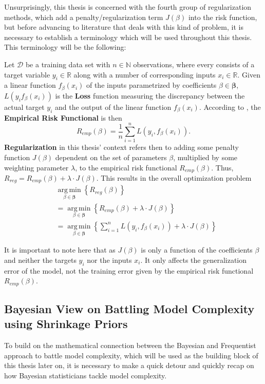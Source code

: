 \documentclass[12pt,a4paper]{article}
\DeclareMathOperator*{\argmin}{arg\,min}
\begin{document}
Unsurprisingly, this thesis is concerned with the fourth group of regularization methods, which add a penalty/regularization term $J(\beta)$ into the risk function, but before advancing to literature that deals with this kind of problem, it is necessary to establish a terminology which will be used throughout this thesis. This terminology will be the following:

Let $\mathcal{D}$ be a training data set with $n \in \mathbb{N}$ observations, where every  consists of a target variable $y_i \in \mathbb{R}$ along with a number of corresponding inputs $x_i \in \mathbb{R}$. Given a linear function $f_\beta(x_i)$ of the inputs parametrized by coefficients $\beta \in \boldsymbol{\beta}$, $L(y_i f_\beta(x_i))$ is the \textbf{Loss} function measuring the discrepancy between the actual target $y_i$ and the output of the linear function $f_\beta(x_i)$. According to \textcite{Vapnik1991}, the \textbf{Empirical Risk Functional} is then 
\[
R_{emp}(\beta) = \frac{1}{n} \sum_{i=1}^n L(y_i, f_\beta(x_i)).
\]
\textbf{Regularization} in this thesis' context refers then to adding some penalty function $J(\beta)$ dependent on the set of parameters $\beta$, multiplied by some weighting parameter $\lambda$, to the empirical risk functional $R_{emp}(\beta)$. Thus, $R_{reg} = R_{emp}(\beta) + \lambda\cdot J(\beta)$. This results in the overall optimization problem
\begin{align}
&\underset{\beta \in \boldsymbol{\beta}}{\argmin}\left\{R_{reg}(\beta)\right\}\nonumber\\
&=\underset{\beta \in \boldsymbol{\beta}}{\argmin}\left\{R_{emp}(\beta) + \lambda\cdot J(\beta)\right\}\nonumber\\
&=\underset{\beta \in \boldsymbol{\beta}}{\argmin}\left\{\sum_{i=1}^n L(y_i, f_\beta(x_i)) + \lambda\cdot J(\beta)\right\}\label{eq:genreg}
\end{align}

It is important to note here that as $J(\beta)$ is only a function of the coefficients $\beta$ and neither the targets $y_i$ nor the inputs $x_i$. It only affects the generalization error of the model, not the training error given by the empirical risk functional $R_{emp}(\beta)$.


\subsection{Bayesian View on Battling Model Complexity using Shrinkage Priors}\label{sec:BayesianShrinkagePriors}
To build on the mathematical connection between the Bayesian and Frequentist approach to battle model complexity, which will be used as the building block of this thesis later on, it is necessary to make a quick detour and quickly recap on how Bayesian statisticians tackle model complexity. 
\end{document}
